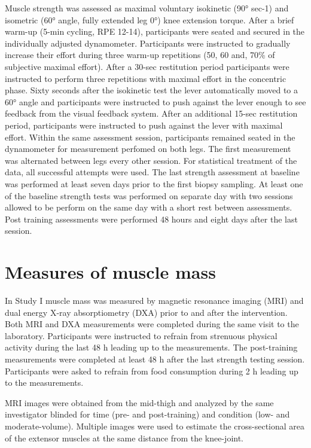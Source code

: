 \documentclass[twoside,10pt]{gihclass} %
\begin{document}
Muscle strength was assessed as maximal voluntary isokinetic (90° sec-1) and isometric (60° angle, fully extended leg 0°) knee extension torque. After a brief warm-up (5-min cycling, RPE 12-14), participants were seated and secured in the individually adjusted dynamometer. Participants were instructed to gradually increase their effort during three warm-up repetitions (50, 60 and, 70\% of subjective maximal effort). After a 30-sec restitution period participants were instructed to perform three repetitions with maximal effort in the concentric phase. Sixty seconds after the isokinetic test the lever automatically moved to a 60° angle and participants were instructed to push against the lever enough to see feedback from the visual feedback system. After an additional 15-sec restitution period, participants were instructed to push against the lever with maximal effort. Within the same assessment session, participants remained seated in the dynamometer for measurement perfomed on both legs. The first measurement was alternated between legs every other session. For statistical treatment of the data, all successful attempts were used. The last strength assessment at baseline was performed at least seven days prior to the first biopsy sampling. At least one of the baseline strength tests was performed on separate day with two sessions allowed to be perform on the same day with a short rest between assessments. Post training assessments were performed 48 hours and eight days after the last session.

\hypertarget{measures-of-muscle-mass}{%
\section{Measures of muscle mass}\label{measures-of-muscle-mass}}

In Study I muscle mass was measured by magnetic resonance imaging (MRI)
and dual energy X-ray absorptiometry (DXA) prior to and after the
intervention. Both MRI and DXA measurements were completed during the
same visit to the laboratory. Participants were instructed to refrain
from strenuous physical activity during the last 48 h leading up to the
measurements. The post-training measurements were completed at least 48
h after the last strength testing session. Participants were asked to
refrain from food consumption during 2 h leading up to the measurements.

MRI images were obtained from the mid-thigh and analyzed by the same
investigator blinded for time (pre- and post-training) and condition
(low- and moderate-volume). Multiple images were used to estimate the
cross-sectional area of the extensor muscles at the same distance from
the knee-joint.
\end{document}
